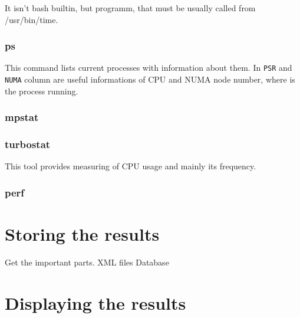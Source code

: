 It isn't bash builtin, but programm, that must be usually called from /usr/bin/time.

\subsection{ps}
This command lists current processes with information about them. In
\texttt{PSR} and \texttt{NUMA} column are useful informations of CPU and NUMA
node number, where is the process running.

\subsection{mpstat}

\subsection{turbostat}
This tool provides measuring of CPU usage and mainly its frequency.

\subsection{perf}

\chapter{Storing the results}
Get the important parts.
XML files
Database

\chapter{Displaying the results}

